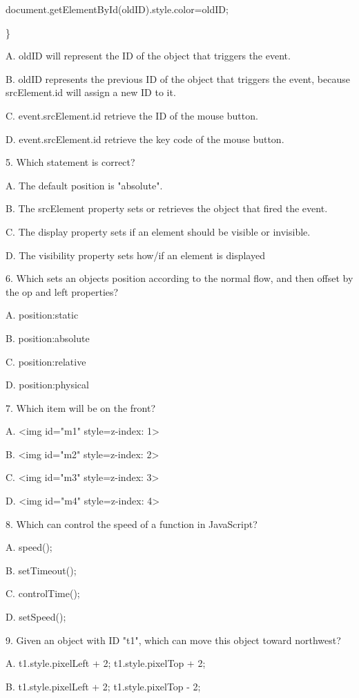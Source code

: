 \documentclass[
]{article}
\begin{document}
document.getElementById(oldID).style.color=oldID;

\}

A. oldID will represent the ID of the object that triggers the event.

B. oldID represents the previous ID of the object that triggers the
event, because srcElement.id will assign a new ID to it.

C. event.srcElement.id retrieve the ID of the mouse button.

D. event.srcElement.id retrieve the key code of the mouse button.

5. Which statement is correct?

A. The default position is "absolute".

B. The srcElement property sets or retrieves the object that fired the
event.

C. The display property sets if an element should be visible or
invisible.

D. The visibility property sets how/if an element is displayed

6. Which sets an object\textquotesingle s position according to the
normal flow, and then offset by the op and left properties?

A. position:static

B. position:absolute

C. position:relative

D. position:physical

7. Which item will be on the front?

A. \textless img id="m1" style=z-index: 1\textgreater{}

B. \textless img id="m2" style=z-index: 2\textgreater{}

C. \textless img id="m3" style=z-index: 3\textgreater{}

D. \textless img id="m4" style=z-index: 4\textgreater{}

8. Which can control the speed of a function in JavaScript?

A. speed();

B. setTimeout();

C. controlTime();

D. setSpeed();

9. Given an object with ID "t1", which can move this object toward
northwest?

A. t1.style.pixelLeft + 2; t1.style.pixelTop + 2;

B. t1.style.pixelLeft + 2; t1.style.pixelTop - 2;
\end{document}
